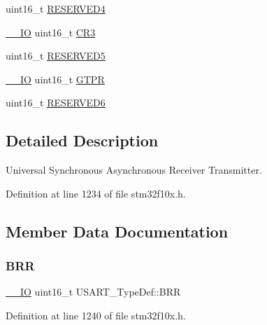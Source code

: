 \begin{DoxyCompactItemize}
\item 
uint16\+\_\+t \hyperlink{struct_u_s_a_r_t___type_def_a6ac527c7428ad8807a7740c1f33f0351}{R\+E\+S\+E\+R\+V\+E\+D4}
\item 
\hyperlink{core__sc300_8h_aec43007d9998a0a0e01faede4133d6be}{\+\_\+\+\_\+\+IO} uint16\+\_\+t \hyperlink{struct_u_s_a_r_t___type_def_a2b9d1df38cb1d745305c8190a8707a0f}{C\+R3}
\item 
uint16\+\_\+t \hyperlink{struct_u_s_a_r_t___type_def_aa893512291681dfbecc5baa899cfafbf}{R\+E\+S\+E\+R\+V\+E\+D5}
\item 
\hyperlink{core__sc300_8h_aec43007d9998a0a0e01faede4133d6be}{\+\_\+\+\_\+\+IO} uint16\+\_\+t \hyperlink{struct_u_s_a_r_t___type_def_abe51502097b1fd281d0a2a1b157d769e}{G\+T\+PR}
\item 
uint16\+\_\+t \hyperlink{struct_u_s_a_r_t___type_def_acd89bb1cba0381c2be8a551e6d14e9f7}{R\+E\+S\+E\+R\+V\+E\+D6}
\end{DoxyCompactItemize}


\subsection{Detailed Description}
Universal Synchronous Asynchronous Receiver Transmitter. 

Definition at line 1234 of file stm32f10x.\+h.



\subsection{Member Data Documentation}
\mbox{\label{struct_u_s_a_r_t___type_def_a2044eb2a0a8a731400d309741bceb2f7}} 
\subsubsection{\texorpdfstring{B\+RR}{BRR}}
{\footnotesize\ttfamily \hyperlink{core__sc300_8h_aec43007d9998a0a0e01faede4133d6be}{\+\_\+\+\_\+\+IO} uint16\+\_\+t U\+S\+A\+R\+T\+\_\+\+Type\+Def\+::\+B\+RR}



Definition at line 1240 of file stm32f10x.\+h.

\mbox{\label{struct_u_s_a_r_t___type_def_a5de50313b1437f7f926093f00902d37a}} 
